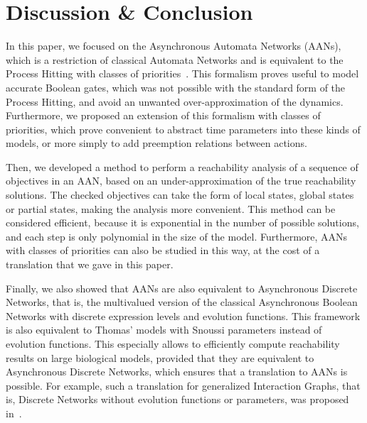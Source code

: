 \section{Discussion \& Conclusion}\label{sec:ccl}

In this paper, we focused on the Asynchronous Automata Networks (AANs),
which is a restriction of classical Automata Networks
and is equivalent to the Process Hitting with classes of priorities~\cite{FPMR13-CS2Bio}.
This formalism proves useful to model accurate Boolean gates, which was not possible
with the standard form of the Process Hitting,
and avoid an unwanted over-approximation of the dynamics.
Furthermore, we proposed an extension of this formalism with classes of priorities,
which prove convenient to abstract time parameters into these kinds of models,
or more simply to add preemption relations between actions.

Then, we developed a method to perform a reachability analysis
of a sequence of objectives in an AAN,
based on an under-approximation of the true reachability solutions.
The checked objectives can take the form of local states, global states
or partial states, making the analysis more convenient.
This method can be considered efficient,
because it is exponential in the number of possible solutions,
and each step is only polynomial in the size of the model.
Furthermore, AANs with classes of priorities can also be studied in this way,
at the cost of a translation that we gave in this paper.

Finally, we also showed that AANs are also equivalent to Asynchronous Discrete Networks,
that is, the multivalued version of the classical Asynchronous Boolean Networks
with discrete expression levels and evolution functions.
This framework is also equivalent to Thomas' models with Snoussi parameters
instead of evolution functions.
This especially allows to efficiently compute reachability results
on large biological models,
provided that they are equivalent to Asynchronous Discrete Networks,
which ensures that a translation to AANs is possible.
For example,
such a translation for generalized Interaction Graphs,
that is, Discrete Networks without evolution functions or parameters,
was proposed in~\cite{PMR10-TCSB}.


